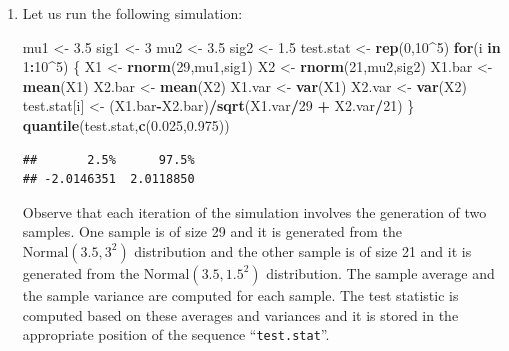 \documentclass[]{krantz}
\makeatletter
\newenvironment{Shaded}{\begin{snugshade}}{\end{snugshade}}
\newcommand{\KeywordTok}[1]{\textcolor[rgb]{0.13,0.29,0.53}{\textbf{#1}}}
\newcommand{\DecValTok}[1]{\textcolor[rgb]{0.00,0.00,0.81}{#1}}
\newcommand{\FloatTok}[1]{\textcolor[rgb]{0.00,0.00,0.81}{#1}}
\newcommand{\StringTok}[1]{\textcolor[rgb]{0.31,0.60,0.02}{#1}}
\newcommand{\ControlFlowTok}[1]{\textcolor[rgb]{0.13,0.29,0.53}{\textbf{#1}}}
\newcommand{\OperatorTok}[1]{\textcolor[rgb]{0.81,0.36,0.00}{\textbf{#1}}}
\newcommand{\NormalTok}[1]{#1}
\newenvironment{kframe}{%
\medskip{}
\setlength{\fboxsep}{.8em}
 \def\at@end@of@kframe{}%
 \ifinner\ifhmode%
  \def\at@end@of@kframe{\end{minipage}}%
  \begin{minipage}{\columnwidth}%
 \fi\fi%
 \def\FrameCommand##1{\hskip\@totalleftmargin \hskip-\fboxsep
 \colorbox{shadecolor}{##1}\hskip-\fboxsep
     \hskip-\linewidth \hskip-\@totalleftmargin \hskip\columnwidth}%
 \MakeFramed {\advance\hsize-\width
   \@totalleftmargin\z@ \linewidth\hsize
   \@setminipage}}%
 {\par\unskip\endMakeFramed%
 \at@end@of@kframe}
\renewenvironment{Shaded}{\begin{kframe}}{\end{kframe}}
\theoremstyle{definition}
\theoremstyle{definition}
\theoremstyle{definition}
\theoremstyle{remark}
\makeatother
\begin{document}
\begin{enumerate}
\def\labelenumi{\arabic{enumi}.}
\item
  Let us run the following simulation:

\begin{Shaded}
\begin{Highlighting}[]
\NormalTok{mu1 <-}\StringTok{ }\FloatTok{3.5}
\NormalTok{sig1 <-}\StringTok{ }\DecValTok{3}
\NormalTok{mu2 <-}\StringTok{ }\FloatTok{3.5}
\NormalTok{sig2 <-}\StringTok{ }\FloatTok{1.5}
\NormalTok{test.stat <-}\StringTok{ }\KeywordTok{rep}\NormalTok{(}\DecValTok{0}\NormalTok{,}\DecValTok{10}\OperatorTok{^}\DecValTok{5}\NormalTok{)}
\ControlFlowTok{for}\NormalTok{(i }\ControlFlowTok{in} \DecValTok{1}\OperatorTok{:}\DecValTok{10}\OperatorTok{^}\DecValTok{5}\NormalTok{) \{}
\NormalTok{  X1 <-}\StringTok{ }\KeywordTok{rnorm}\NormalTok{(}\DecValTok{29}\NormalTok{,mu1,sig1)}
\NormalTok{  X2 <-}\StringTok{ }\KeywordTok{rnorm}\NormalTok{(}\DecValTok{21}\NormalTok{,mu2,sig2)}
\NormalTok{  X1.bar <-}\StringTok{ }\KeywordTok{mean}\NormalTok{(X1)}
\NormalTok{  X2.bar <-}\StringTok{ }\KeywordTok{mean}\NormalTok{(X2)}
\NormalTok{  X1.var <-}\StringTok{ }\KeywordTok{var}\NormalTok{(X1)}
\NormalTok{  X2.var <-}\StringTok{ }\KeywordTok{var}\NormalTok{(X2)}
\NormalTok{  test.stat[i] <-}\StringTok{ }\NormalTok{(X1.bar}\OperatorTok{-}\NormalTok{X2.bar)}\OperatorTok{/}\KeywordTok{sqrt}\NormalTok{(X1.var}\OperatorTok{/}\DecValTok{29} \OperatorTok{+}\StringTok{ }\NormalTok{X2.var}\OperatorTok{/}\DecValTok{21}\NormalTok{)}
\NormalTok{\}}
\KeywordTok{quantile}\NormalTok{(test.stat,}\KeywordTok{c}\NormalTok{(}\FloatTok{0.025}\NormalTok{,}\FloatTok{0.975}\NormalTok{))}
\end{Highlighting}
\end{Shaded}

\begin{verbatim}
##       2.5%      97.5% 
## -2.0146351  2.0118850
\end{verbatim}

  Observe that each iteration of the simulation involves the generation
  of two samples. One sample is of size 29 and it is generated from the
  \(\mathrm{Normal}(3.5,3^2)\) distribution and the other sample is of
  size 21 and it is generated from the \(\mathrm{Normal}(3.5,1.5^2)\)
  distribution. The sample average and the sample variance are computed
  for each sample. The test statistic is computed based on these
  averages and variances and it is stored in the appropriate position of
  the sequence ``\texttt{test.stat}''.


\end{enumerate}
\end{document}
